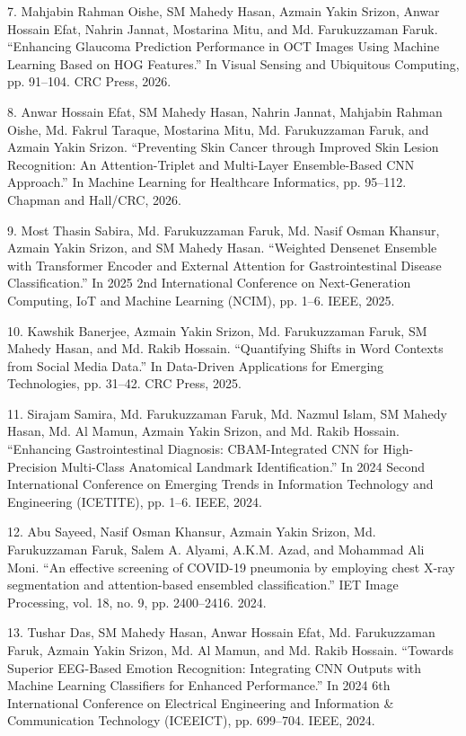 \documentclass[a4paper,10pt]{article}
\newlength{\cvcolumngapwidth}
\newlength{\cvleftcolumnwidth}
\newlength{\cvrightcolumnwidth}
\newcommand{\cvdurationstyle}[1]{{\small\cvdurationfont\textcolor{cvdurationcolor}{#1}}}
\newlength{\cvafteritemskipamount}
\newlength{\cvparskip}
\newcommand{\cvitem}[2]{
    \begin{minipage}[t]{\cvleftcolumnwidth}
        \raggedleft #1
    \end{minipage}%
    \hspace{\cvcolumngapwidth}%
    \begin{minipage}[t]{\cvrightcolumnwidth}
        \setlength{\parskip}{\cvparskip} #2
    \end{minipage}

    \vspace{\cvafteritemskipamount}
}
\begin{document}
\cvitem{
    \cvdurationstyle{}
}{
7. Mahjabin Rahman Oishe, SM Mahedy Hasan, Azmain Yakin Srizon, Anwar Hossain Efat, Nahrin Jannat, Mostarina Mitu, and Md. Farukuzzaman Faruk. “Enhancing Glaucoma Prediction Performance in OCT Images Using Machine Learning Based on HOG Features.” In Visual Sensing and Ubiquitous Computing, pp. 91–104. CRC Press, 2026.
}

\cvitem{
    \cvdurationstyle{}
}{
8. Anwar Hossain Efat, SM Mahedy Hasan, Nahrin Jannat, Mahjabin Rahman Oishe, Md. Fakrul Taraque, Mostarina Mitu, Md. Farukuzzaman Faruk, and Azmain Yakin Srizon. “Preventing Skin Cancer through Improved Skin Lesion Recognition: An Attention-Triplet and Multi-Layer Ensemble-Based CNN Approach.” In Machine Learning for Healthcare Informatics, pp. 95–112. Chapman and Hall/CRC, 2026.
}

\cvitem{
    \cvdurationstyle{}
}{
9. Most Thasin Sabira, Md. Farukuzzaman Faruk, Md. Nasif Osman Khansur, Azmain Yakin Srizon, and SM Mahedy Hasan. “Weighted Densenet Ensemble with Transformer Encoder and External Attention for Gastrointestinal Disease Classification.” In 2025 2nd International Conference on Next-Generation Computing, IoT and Machine Learning (NCIM), pp. 1–6. IEEE, 2025.
}

\cvitem{
    \cvdurationstyle{}
}{
10. Kawshik Banerjee, Azmain Yakin Srizon, Md. Farukuzzaman Faruk, SM Mahedy Hasan, and Md. Rakib Hossain. “Quantifying Shifts in Word Contexts from Social Media Data.” In Data-Driven Applications for Emerging Technologies, pp. 31–42. CRC Press, 2025.
}

\cvitem{
    \cvdurationstyle{}
}{
11. Sirajam Samira, Md. Farukuzzaman Faruk, Md. Nazmul Islam, SM Mahedy Hasan, Md. Al Mamun, Azmain Yakin Srizon, and Md. Rakib Hossain. “Enhancing Gastrointestinal Diagnosis: CBAM-Integrated CNN for High-Precision Multi-Class Anatomical Landmark Identification.” In 2024 Second International Conference on Emerging Trends in Information Technology and Engineering (ICETITE), pp. 1–6. IEEE, 2024.
}

\cvitem{
    \cvdurationstyle{}
}{
12. Abu Sayeed, Nasif Osman Khansur, Azmain Yakin Srizon, Md. Farukuzzaman Faruk, Salem A. Alyami, A.K.M. Azad, and Mohammad Ali Moni. “An effective screening of COVID-19 pneumonia by employing chest X-ray segmentation and attention-based ensembled classification.” IET Image Processing, vol. 18, no. 9, pp. 2400–2416. 2024.
}

\cvitem{
    \cvdurationstyle{}
}{
13. Tushar Das, SM Mahedy Hasan, Anwar Hossain Efat, Md. Farukuzzaman Faruk, Azmain Yakin Srizon, Md. Al Mamun, and Md. Rakib Hossain. “Towards Superior EEG-Based Emotion Recognition: Integrating CNN Outputs with Machine Learning Classifiers for Enhanced Performance.” In 2024 6th International Conference on Electrical Engineering and Information \& Communication Technology (ICEEICT), pp. 699–704. IEEE, 2024.
}
\end{document}
